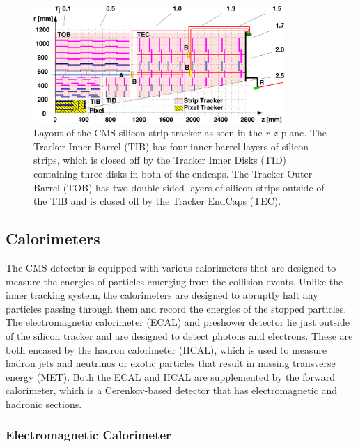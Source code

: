\begin{figure}[htbp] %
  \centering
  \includegraphics[width=0.85\textwidth]{fig/experiment/cms_siliconTracker.pdf}
  \caption{
    Layout of the CMS silicon strip tracker as seen in the $r$-$z$ plane.
    The Tracker Inner Barrel (TIB) has four inner barrel layers of silicon strips, which is closed off by the Tracker Inner Disks (TID) containing three disks in both of the endcaps.
    The Tracker Outer Barrel (TOB) has two double-sided layers of silicon strips outside of the TIB and is closed off by the Tracker EndCaps (TEC).
  }
  \label{fig:CMSsilicon}
\end{figure}

\subsection{Calorimeters}
\label{subsec:calorimeter}

The CMS detector is equipped with various calorimeters that are designed to measure the energies of particles emerging from the collision events.
Unlike the inner tracking system, the calorimeters are designed to abruptly halt any particles passing through them and record the energies of the stopped particles.
The electromagnetic calorimeter (ECAL) and preshower detector lie just outside of the silicon tracker and are designed to detect photons and electrons.
These are both encased by the hadron calorimeter (HCAL), which is used to measure hadron jets and neutrinos or exotic particles that result in missing transverse energy (MET\footnotemark).
Both the ECAL and HCAL are supplemented by the forward calorimeter, which is a Cerenkov-based detector that has electromagnetic and hadronic sections. %

\subsubsection{Electromagnetic Calorimeter}


